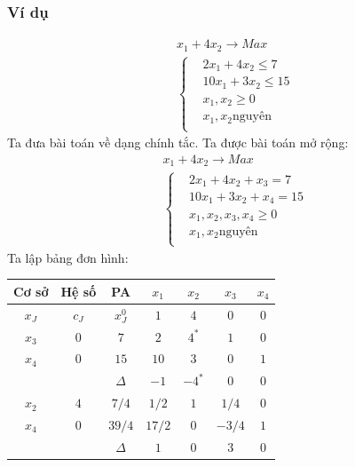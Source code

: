 \documentclass[12pt,a4paper]{report}
\begin{document}
    \subsubsection{Ví dụ}
    \begin{equation*}
        \begin{split}
         &x_1+4x_2 \longrightarrow Max \\
        & \left\{\begin{split}
            & 2x_1+4x_2 \le 7\\
            & 10x_1+3x_2\le 15\\
            & x_1,x_2 \ge 0\\
            & x_1,x_2 \text{nguyên}\\
        \end{split}\right.
    \end{split}
    \end{equation*}
    Ta đưa bài toán về dạng chính tắc. Ta được bài toán mở rộng:\\
    \begin{equation*}
        \begin{split}
         &x_1+4x_2 \longrightarrow Max \\
        & \left\{\begin{split}
            & 2x_1+4x_2+x_3= 7\\
            & 10x_1+3x_2+   x_4= 15\\
            & x_1,x_2,x_3,x_4 \ge 0\\
            & x_1,x_2 \text{nguyên}\\
        \end{split}\right.
    \end{split}
    \end{equation*}
    Ta lập bảng đơn hình:\\
    \begin{center}
        \begin{tabular}{|c|c|c|c|c|c|c|}
    \hline
     Cơ sở & Hệ số & PA& $x_1$ &$x_2$ &$ x_3$ &$x_4$ \\
     \hline
        $x_J$ &$c_J$ &$x_J^0$ &$1$ &$4$ &$0$ &$0$\\
        \hline
        $x_3$ &$0$ &$7$ &$2$ &$4^*$ &$1$ &$0$\\
        $x_4$ &$0$ &$15$ &$10$ &$3$ &$0$ &$1$\\
        \hline
        && $\Delta$ &$-1$ &$-4^*$ &$0$ &$0$\\
        \hline
        $x_2$ &$4$ &$7/4$ &$1/2$ &$1$ &$1/4$ &$0$\\
        $x_4$ &$0$ &$39/4$ &$17/2$ &$0$ &$-3/4$ &$1$\\
        \hline
        && $\Delta$ &$1$ & $0$ &$3$ &$0$\\
        \hline
    \end{tabular}
    \end{center}
\end{document}
